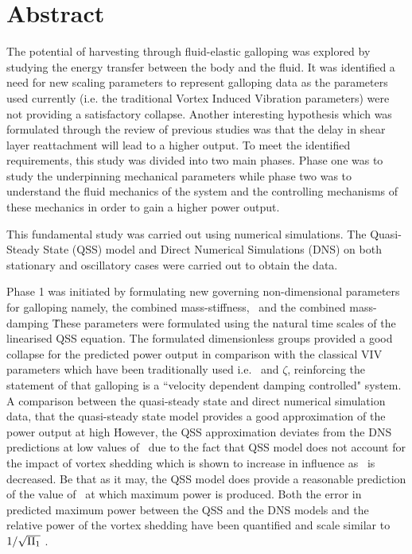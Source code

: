 \chapter*{Abstract}

The potential of harvesting through fluid-elastic galloping was explored by studying the energy transfer between the body and the fluid. It was identified a need for new scaling parameters to represent galloping data as the parameters used currently (i.e. the traditional Vortex Induced Vibration parameters) were not providing a satisfactory collapse. Another interesting hypothesis which was formulated through the review of previous studies was that the delay in shear layer reattachment will lead to a higher output. To meet the identified requirements, this study was divided into two main phases. Phase one was to study the underpinning mechanical parameters while phase two was to understand the fluid mechanics of the system and the controlling mechanisms of these mechanics in order to gain a higher power output. 

This fundamental study was carried out using numerical simulations. The Quasi-Steady State (QSS) model and Direct Numerical Simulations (DNS) on both stationary and oscillatory cases were carried out to obtain the data.


Phase 1 was initiated by formulating new governing non-dimensional parameters for galloping namely, the combined mass-stiffness, \massstiff\, and the combined mass-damping \massdamp\. These parameters were formulated using the natural time scales of the linearised QSS equation. The formulated dimensionless groups provided a good collapse for the predicted power output in comparison with the classical VIV parameters which have been traditionally used i.e. \ustar\ and $\zeta$, reinforcing the statement of \citet{Paidoussis2010} that galloping is a ``velocity dependent damping controlled" system. 
A comparison between the quasi-steady state and direct numerical simulation data, that the quasi-steady state model provides a good approximation of the power output at high \massstiff\. However, the QSS approximation deviates from the DNS predictions at low values of \massstiff\ due to the fact that QSS model does not account for the impact of vortex shedding which is shown to increase in influence as \massstiff\ is decreased. Be that as it may, the QSS model does provide a reasonable prediction of the value of \massdamp\ at which maximum power is produced. Both the error in predicted maximum power between the QSS and the DNS models and the relative power of the vortex shedding have been quantified and scale similar to $1/\sqrt{\Pi_1}$ .

